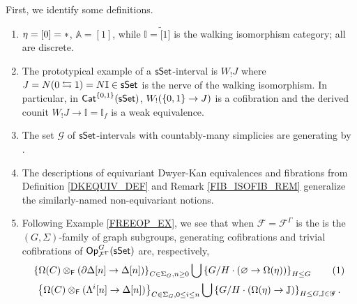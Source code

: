 \documentclass[a4paper,10pt
,draft
]{article}%
\renewcommand{\F}{\mathcal F}
\newcommand{\I}{\mathbb I}
\renewcommand{\1}{\eta}%
\begin{document}
First, we identify some definitions.
\begin{enumerate}[label = (\roman*)]
\item $\eta = [0] = \**$, $\mathbb A = [1]$, while $\mathbb I = \tilde [1]$ is the walking isomorphism category; all are discrete.
\item  The prototypical example of a $\mathsf{sSet}$-interval is $W_!J$ where $J = N(0 \leftrightarrows 1) = N \I \in \sSet$ is the nerve of the walking isomorphism.
      In particular, in $\mathsf{Cat}^{\left\{0,1\right\}}(\mathsf{sSet})$,
      $W_!(\left\{0,1\right\} \to J)$ is a cofibration and
      the derived counit $W_!J \to \I = \I_f$ is a weak equivalence.
\item The set $\mathscr G$ of $\mathsf{sSet}$-intervals with countably-many simplicies are generating by \cite[Lemmas 4.2,4.3]{Ber07b}.
\item The descriptions of equivariant Dwyer-Kan equivalences and fibrations from Definition \ref{DKEQUIV_DEF} and Remark \ref{FIB_ISOFIB_REM} generalize the similarly-named non-equivariant notions.
\item Following Example \ref{FREEOP_EX}, we see that
      when $\F = \F^\Gamma$ is the is the $(G, \Sigma)$-family of graph subgroups,
      generating cofibrations and trivial cofibrations of $\Op^G_{\F^\Gamma}(\sSet)$ are, respectively, 
      \begin{gather*}
            \set{\Omega(C) \otimes_\Fin(\partial \Delta[n] \to \Delta[n])}_{C \in \Sigma_G, n \geq 0} \bigcup 
            \set{G/H \cdot (\varnothing \to \Omega(\eta))}_{H \leq G}
            \stepcounter{equation}\tag{\theequation}\label{SSETGENCOF_EQ}
            \\
            \set{\Omega(C) \otimes_\Fin(\Lambda^i[n] \to \Delta[n])}_{C \in \Sigma_G, 0 \leq i \leq n} \bigcup
            \set{G/H \cdot (\Omega(\eta) \to \mathbb J)}_{H \leq G, \mathbb J \in \mathscr G}.
      \end{gather*}     
\end{enumerate}    
\end{document}
